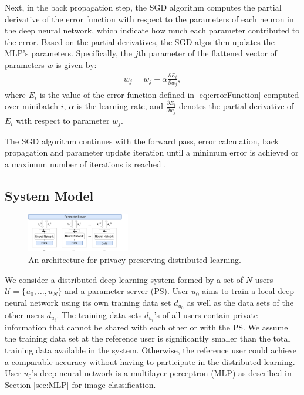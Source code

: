 \documentclass[conference]{IEEEtran}
\begin{document}
Next, in the back propagation step, the SGD algorithm 
computes the partial derivative of the error function with respect to the
parameters of each neuron in the deep neural network, which indicate how much each parameter contributed to
the error. Based on the partial derivatives, the SGD algorithm updates the MLP's parameters.
 Specifically, the $j$th parameter of the flattened vector of parameters $w$ is given by:
\begin{align}\label{eq:SGD}
w_j = w_j -\alpha \frac{\partial E_i}{\partial w_j}, 
\end{align}
where $E_i$ is the value of the error function defined in \ref{eq:errorFunction} computed over
minibatch $i$, $\alpha$ is the learning rate, and  $\frac{\partial E_i}{\partial w_j}$ denotes the partial derivative of $E_i$ with
respect to parameter $w_j$.

The SGD algorithm continues with the forward pass, error calculation, back propagation and parameter update iteration until a minimum
error is achieved or a maximum number of iterations is reached \cite{ruder2016overview}. 


\subsection{System Model} \label{sec:systemModel}
\begin{figure}[t]
\centering
\includegraphics[width=0.4\textwidth, keepaspectratio]{HighLevelArch.pdf}
\caption{An architecture for privacy-preserving distributed learning.}
\label{fig:HighLevel}
\end{figure}
 
We consider a distributed deep learning system formed by a set of $N$ users $\mathcal{U}= \{u_0, \dots,u_N\}$ and
a parameter server (PS). User $u_0$ aims to train a local deep neural network using its own training data set
$d_{u_0}$ as well as the data sets of the other users $d_{u_i}$. 
The training data sets $d_{u_i}$'s of all users contain private information that cannot be shared with each other or with the PS.  We
assume the training data set at the reference user is significantly smaller  than the total training data available in the system.
Otherwise, the reference user could achieve a comparable accuracy without having to participate in the distributed learning. 
User $u_0$'s deep neural network is a multilayer perceptron (MLP) as described in Section \ref{sec:MLP} for image classification.
\end{document}
